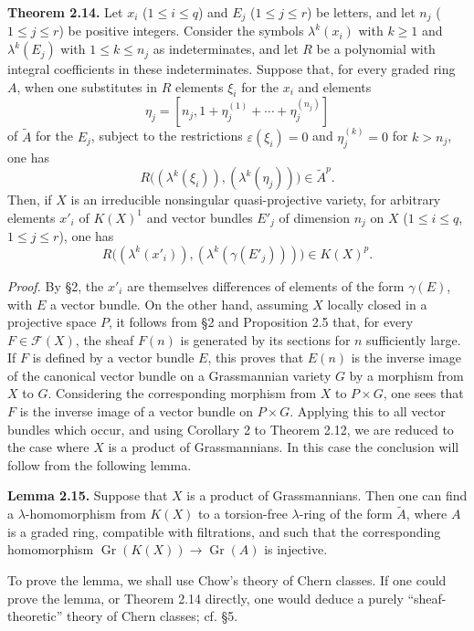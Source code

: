 \documentclass[11pt]{article}
\newcommand{\Gr}{\operatorname{Gr}}
\providecommand{\Gr}{\operatorname{Gr}}
\providecommand{\Atil}{\widetilde A}
\providecommand{\cF}{\mathscr F}
\providecommand{\Gr}{\operatorname{G}}
\begin{document}
\textbf{Theorem 2.14.} Let $x_i$ ($1\leq i\leq q$) and $E_j$ ($1\leq j\leq r$) be letters, and let $n_j$ ($1\leq j\leq r$) be positive integers. Consider the symbols $\lambda^k(x_i)$ with $k\geq 1$ and $\lambda^k(E_j)$ with $1\leq k\leq n_j$ as indeterminates, and let $R$ be a polynomial with integral coefficients in these indeterminates. Suppose that, for every graded ring $A$, when one substitutes in $R$ elements $\xi_i$ for the $x_i$ and elements
\[
 \eta_j=[n_j,1+\eta_j^{(1)}+\cdots+\eta_j^{(n_j)}]
\]
of $\Atil$ for the $E_j$, subject to the restrictions $\varepsilon(\xi_i)=0$ and $\eta_j^{(k)}=0$ for $k>n_j$, one has
\[
 R\bigl((\lambda^k(\xi_i)),(\lambda^k(\eta_j))\bigr)\in \Atil^p.
\]
Then, if $X$ is an irreducible nonsingular quasi-projective variety, for arbitrary elements $x'_i$ of $K(X)^1$ and vector bundles $E'_j$ of dimension $n_j$ on $X$ ($1\leq i\leq q$, $1\leq j\leq r$), one has
\begin{equation}\tag{*}
 R\bigl((\lambda^k(x'_i)),(\lambda^k(\gamma(E'_j)))\bigr)\in K(X)^p.
\end{equation}

\emph{Proof.} By \S 2, the $x'_i$ are themselves differences of elements of the form $\gamma(E)$, with $E$ a vector bundle. On the other hand, assuming $X$ locally closed in a projective space $P$, it follows from \S 2 and Proposition 2.5 that, for every $F\in\cF(X)$, the sheaf $F(n)$ is generated by its sections for $n$ sufficiently large. If $F$ is defined by a vector bundle $E$, this proves that $E(n)$ is the inverse image of the canonical vector bundle on a Grassmannian variety $G$ by a morphism from $X$ to $G$. Considering the corresponding morphism from $X$ to $P\times G$, one sees that $F$ is the inverse image of a vector bundle on $P\times G$. Applying this to all vector bundles which occur, and using Corollary 2 to Theorem 2.12, we are reduced to the case where $X$ is a product of Grassmannians. In this case the conclusion will follow from the following lemma.

\textbf{Lemma 2.15.} Suppose that $X$ is a product of Grassmannians. Then one can find a $\lambda$-homomorphism from $K(X)$ to a torsion-free $\lambda$-ring of the form $\Atil$, where $A$ is a graded ring, compatible with filtrations, and such that the corresponding homomorphism $\Gr(K(X))\to\Gr(A)$ is injective.

To prove the lemma, we shall use Chow's theory of Chern classes. If one could prove the lemma, or Theorem 2.14 directly, one would deduce a purely ``sheaf-theoretic'' theory of Chern classes; cf. \S 5.
\end{document}
